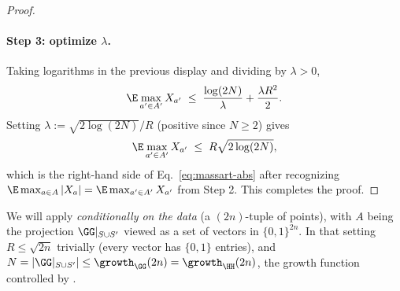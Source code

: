 \begin{proof}
\paragraph{Step 3: optimize $\lambda$.}
Taking logarithms in the previous display and dividing by $\lambda > 0$,
\begin{align*}
\E \max_{a' \in A'} X_{a'}
\;\le\; \frac{\log(2 N)}{\lambda} + \frac{\lambda R^2}{2}.
\end{align*}
Setting $\lambda := \sqrt{2 \log(2 N)} / R$ (positive since $N \ge 2$) gives
\begin{align*}
\E \max_{a' \in A'} X_{a'}
\;\le\; R \sqrt{2 \log(2N)},
\end{align*}
which is the right-hand side of Eq.~\eqref{eq:massart-abs} after recognizing $\E \max_{a \in A} | X_a | = \E \max_{a' \in A'} X_{a'}$ from Step 2. This completes the proof.
\end{proof}

\begin{remark}\label{rem:massart-data-dependent}
We will apply  \emph{conditionally on the data} (a $(2n)$-tuple of points), with $A$ being the projection $\GG|_{S \cup S'}$ viewed as a set of vectors in $\{0,1\}^{2n}$. In that setting $R \le \sqrt{2n}$ trivially (every vector has $\{0,1\}$ entries), and $N = |\GG|_{S \cup S'}| \le \growth_{\GG}(2n) = \growth_{\HH}(2n)$, the growth function controlled by .
\end{remark}
